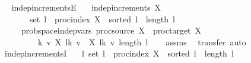 \begin{isabellebody}
{\isadelimproof
\ %
\endisadelimproof
%
\isatagproof
\isacommand{{\isachardot}{\kern0pt}}\isamarkupfalse%
%
\endisatagproof
{\isafoldproof}%
%
\isadelimproof
%
\endisadelimproof
%
}%
\isamarkupfalse%
\ indep{\isacharunderscore}{\kern0pt}incrementsE{\isacharcolon}{\kern0pt}\isanewline
\ \ \ {\isachardoublequoteopen}indep{\isacharunderscore}{\kern0pt}increments\ X{\isachardoublequoteclose}\isanewline
\ \ \ \ \ \ \ {\isachardoublequoteopen}set\ l\ {\isasymsubseteq}\ proc{\isacharunderscore}{\kern0pt}index\ X\ {\isasymand}\ sorted\ l\ {\isasymand}\ length\ l\ {\isasymge}\ {}{\isachardoublequoteclose}\isanewline
\ \ \ \ \ {\isachardoublequoteopen}prob{\isacharunderscore}{\kern0pt}space{\isachardot}{\kern0pt}indep{\isacharunderscore}{\kern0pt}vars\ {\isacharparenleft}{\kern0pt}proc{\isacharunderscore}{\kern0pt}source\ X{\isacharparenright}{\kern0pt}\ {\isacharparenleft}{\kern0pt}{\isasymlambda}{\isacharunderscore}{\kern0pt}{\isachardot}{\kern0pt}\ proc{\isacharunderscore}{\kern0pt}target\ X{\isacharparenright}{\kern0pt}\isanewline
\ \ \ \ \ \ \ \ \ {\isacharparenleft}{\kern0pt}{\isasymlambda}k\ v{\isachardot}{\kern0pt}\ X\ {\isacharparenleft}{\kern0pt}l{\isacharbang}{\kern0pt}k{\isacharparenright}{\kern0pt}\ v\ {\isacharminus}{\kern0pt}\ X\ {\isacharparenleft}{\kern0pt}l{\isacharbang}{\kern0pt}{\isacharparenleft}{\kern0pt}k{\isacharminus}{\kern0pt}{}{\isacharparenright}{\kern0pt}{\isacharparenright}{\kern0pt}\ v{\isacharparenright}{\kern0pt}\ {\isacharbraceleft}{\kern0pt}{}{\isachardot}{\kern0pt}{\isachardot}{\kern0pt}{\isacharless}{\kern0pt}length\ l{\isacharbraceright}{\kern0pt}{\isachardoublequoteclose}\isanewline
%
\isadelimproof
\ \ %
\endisadelimproof
%
\isatagproof
{}\isamarkupfalse%
\ assms\ \isamarkupfalse%
\ {\isacharparenleft}{\kern0pt}transfer{\isacharcomma}{\kern0pt}\ auto{\isacharparenright}{\kern0pt}%
\endisatagproof
{\isafoldproof}%
%
\isadelimproof
\isanewline
%
\endisadelimproof
\isanewline
{}\isamarkupfalse%
\ indep{\isacharunderscore}{\kern0pt}incrementsI{\isacharcolon}{\kern0pt}\isanewline
\ \ \ {\isachardoublequoteopen}{\isasymAnd}l{\isachardot}{\kern0pt}\ set\ l\ {\isasymsubseteq}\ proc{\isacharunderscore}{\kern0pt}index\ X\ {\isasymLongrightarrow}\ sorted\ l\ {\isasymLongrightarrow}\ length\ l\ {\isasymge}\ {}\ {\isasymLongrightarrow}\isanewline

\end{isabellebody}
